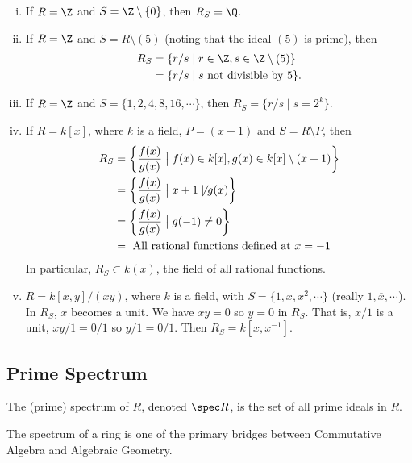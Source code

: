 \begin{ex} \hfill 
	\begin{enumerate}[(i)]
	\item If $R=\Z$ and $S=\Z\setminus \{0\}$, then $R_S=\Q$.
	\item If $R=\Z$ and $S=R\setminus (5)$ (noting that the ideal $(5)$ is prime), then
		\[
		\begin{split}
		R_S&= \{ r/s \;|\; r \in \Z, s \in \Z \setminus (5) \} \\
		&= \{ r/s \;|\; s \text{ not divisible by } 5 \}.
		\end{split}
		\]
	\item If $R=\Z$ and $S=\{1,2,4,8,16,\cdots\}$, then $R_S=\{r/s\;|\; s=2^k\}$.
	\item If $R=k[x]$, where $k$ is a field, $P=(x+1)$ and $S=R \setminus P$, then
		\[
		\begin{split}
		R_S&= \left\{ \frac{f(x)}{g(x)} \; \big| \; f(x) \in k[x], g(x) \in k[x] \setminus (x+1) \right\} \\
		&= \left\{ \frac{f(x)}{g(x)} \; \big| \; x+1 \not\mid g(x) \right\} \\
		&= \left\{ \frac{f(x)}{g(x)} \; \big| \; g(-1) \neq 0 \right\} \\
		&=\text{ All rational functions defined at } x=-1
		\end{split}
		\]
In particular, $R_S \subset k(x)$, the field of all rational functions.
	\item $R=k[x,y]/(xy)$, where $k$ is a field, with $S=\{1,x,x^2,\cdots\}$ (really $\overline{1},\overline{x},\cdots$). In $R_S$, $x$ becomes a unit. We have $xy=0$ so $y=0$ in $R_S$. That is, $x/1$ is a unit, $xy/1=0/1$ so $y/1=0/1$. Then $R_S=k[x,x^{-1}]$.
	\end{enumerate}
\end{ex}



\subsection{Prime Spectrum} 



\begin{dfn}
The (prime) spectrum of $R$, denoted $\spec R$, is the set of all prime ideals in $R$.
\end{dfn}

The spectrum of a ring is one of the primary bridges between Commutative Algebra and Algebraic Geometry. 

